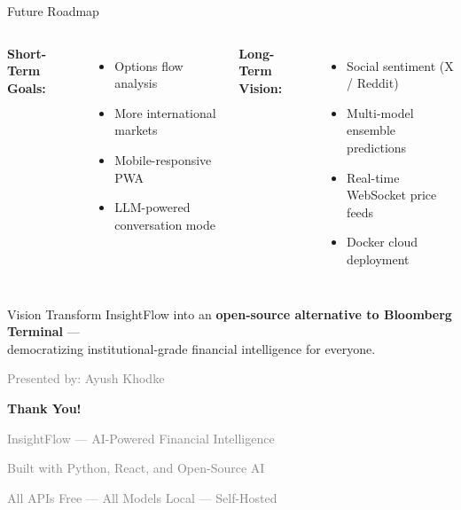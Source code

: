 \documentclass[aspectratio=169, 11pt]{beamer}
\begin{document}
\begin{frame}{Future Roadmap}
\begin{columns}[T]

\textbf{Short-Term Goals:}
\begin{itemize}
    \item Options flow analysis
    \item More international markets
    \item Mobile-responsive PWA
    \item LLM-powered conversation mode
\end{itemize}


\textbf{Long-Term Vision:}
\begin{itemize}
    \item Social sentiment (X / Reddit)
    \item Multi-model ensemble predictions
    \item Real-time WebSocket price feeds
    \item Docker cloud deployment
\end{itemize}
\end{columns}

\vspace{0.5cm}
\begin{block}{Vision}
\centering
Transform InsightFlow into an \textbf{open-source alternative to Bloomberg Terminal} ---\\
democratizing institutional-grade financial intelligence for everyone.
\end{block}
\vfill
{\tiny\textcolor{gray}{Presented by: Ayush Khodke}}
\end{frame}
\begin{frame}[plain]
\begin{center}
\vspace{1.5cm}
{\Huge \textbf{\textcolor{accentcyan}{Thank You!}}}

\vspace{1cm}
{\Large \textcolor{gray}{InsightFlow --- AI-Powered Financial Intelligence}}


\vspace{0.6cm}
{\normalsize \textcolor{gray}{Built with Python, React, and Open-Source AI}}

\vspace{0.4cm}
{\small \textcolor{gray}{All APIs Free --- All Models Local --- Self-Hosted}}

\end{center}
\end{frame}
\end{document}
